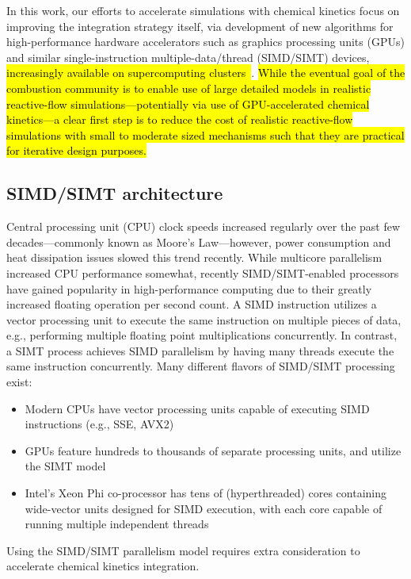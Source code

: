 \documentclass[preprint,review,11pt]{elsarticle}
\DeclareRobustCommand{\hlg}[1]{\sethlcolor{green}\hl{#1}}
\DeclareRobustCommand{\hlg}[1]{\empty{#1}}
\begin{document}
In this work, our efforts to accelerate simulations with chemical kinetics focus on improving the integration strategy itself, via development of new algorithms for high-performance hardware accelerators such as graphics processing units (GPUs) and similar single-instruction multiple-data\slash thread (SIMD\slash SIMT) devices, \hlg{increasingly available on supercomputing clusters~\cite{nvidia,xsede,orlcf}}.
\hlg{While the eventual goal of the combustion community is to enable use of large detailed models in realistic reactive-flow simulations---potentially via use of GPU-accelerated chemical kinetics---a clear first step is to reduce the cost of realistic reactive-flow simulations with small to moderate sized mechanisms such that they are practical for iterative design purposes.}


\subsection{SIMD\slash SIMT architecture}

Central processing unit (CPU) clock speeds increased regularly over the past few decades---commonly known as Moore's Law---however, power consumption and heat dissipation issues slowed this trend recently.
While multicore parallelism increased CPU performance somewhat, recently SIMD\slash SIMT-enabled processors have gained popularity in high-performance computing due to their greatly increased floating operation per second count.
A SIMD instruction utilizes a vector processing unit to execute the same instruction on multiple pieces of data, e.g., performing multiple floating point multiplications concurrently.
In contrast, a SIMT process achieves SIMD parallelism by having many threads execute the same instruction concurrently.
Many different flavors of SIMD\slash SIMT processing exist:
\begin{itemize}
 \item Modern CPUs have vector processing units capable of executing SIMD instructions (e.g., SSE, AVX2)
 \item GPUs feature hundreds to thousands of separate processing units, and utilize the SIMT model
 \item Intel's Xeon Phi co-processor has tens of (hyperthreaded) cores containing wide-vector units designed for SIMD execution, with each core capable of running multiple independent threads
\end{itemize}
Using the SIMD\slash SIMT parallelism model requires extra consideration to accelerate chemical kinetics integration.
\end{document}
